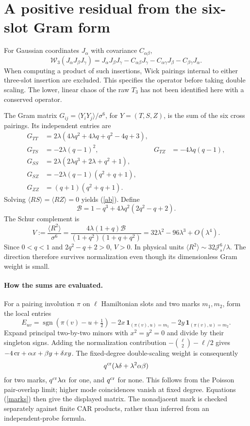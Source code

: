 \documentclass[11pt,a4paper]{article}
\newcommand{\Js}{\mathcal J_s}
\newcommand{\W}{\mathcal W_3}
\newcommand{\av}[1]{\langle #1\rangle}
\begin{document}
\newpage
\section{A positive residual from the six-slot Gram form}
For Gaussian coordinates $J_\alpha$ with covariance $C_{\alpha\beta}$,
\[
 \W(J_\alpha J_\beta J_\gamma)
 =J_\alpha J_\beta J_\gamma
 -C_{\alpha\beta}J_\gamma-C_{\alpha\gamma}J_\beta
 -C_{\beta\gamma}J_\alpha .
\]
When computing a product of such insertions, Wick pairings internal
to either three-slot insertion are excluded. This specifies the
operator before taking double scaling. The lower, linear chaos of
the raw $T_3$ has not been identified here with a conserved operator.

The Gram matrix $G_{ij}=\av{Y_iY_j}/\sigma^6$, for $Y=(T,S,Z)$,
is the sum of the six cross pairings. Its independent entries are
\begin{align}
 G_{TT}&=2\lambda(4\lambda q^2+4\lambda q+q^2-4q+3),\\
 G_{TS}&=-2\lambda(q-1)^2,&G_{TZ}&=-4\lambda q(q-1),\\
 G_{SS}&=2\lambda(2\lambda q^3+2\lambda+q^2+1),\\
 G_{SZ}&=-2\lambda(q-1)(q^2+q+1),\\
 G_{ZZ}&=(q+1)(q^2+q+1).
\end{align}
Solving $\av{RS}=\av{RZ}=0$ yields (\ref{ab}). Define
\[
 \mathcal B=1-q^3+4\lambda q^2(2q^2-q+2).
\]
The Schur complement is
\begin{equation}
 V:=\frac{\av{R^2}}{\sigma^6}
   =\frac{4\lambda(1+q)\mathcal B}{(1+q^2)(1+q+q^2)}
   =32\lambda^2-96\lambda^3+O(\lambda^4).              \label{V}
\end{equation}
Since $0<q<1$ and $2q^2-q+2>0$, $V>0$. In physical units
$\av{R^2}\sim32\Js^6/\lambda$. The direction therefore survives
normalization even though its dimensionless Gram weight is small.

\paragraph{How the sums are evaluated.}
For a pairing involution $\pi$ on $\ell$ Hamiltonian slots and two
marks $m_1,m_2$, form the local entries
\[
 E_{uv}=\operatorname{sgn}(\pi(v)-u+\tfrac12)
       -2x\,\mathbf1_{(\pi(v),u)=m_1}
       -2y\,\mathbf1_{(\pi(v),u)=m_2}.
\]
Expand principal two-by-two minors with $x^2=y^2=0$ and divide by
their singleton signs. Adding the normalization contribution
$-\binom{\ell}{2}-\ell/2$ gives
$-4\,{\rm cr}+\alpha x+\beta y+\delta xy$.
The fixed-degree double-scaling weight is consequently
\[
 q^{\rm cr}(\lambda\delta+\lambda^2\alpha\beta)
\]
for two marks, $q^{\rm cr}\lambda\alpha$ for one, and $q^{\rm cr}$
for none. This follows from the Poisson pair-overlap limit; higher
mode coincidences vanish at fixed degree. Equations (\ref{marks})
then give the displayed matrix. The nonadjacent mark is checked
separately against finite CAR products, rather than inferred from
an independent-probe formula.
\end{document}

